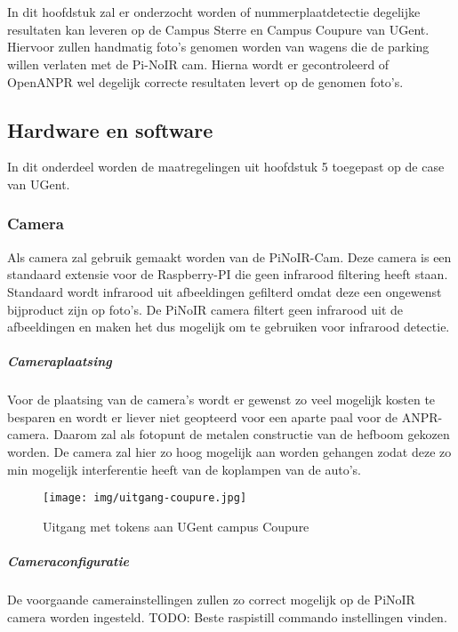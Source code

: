 
\chapter{}
\label{ch:praktischeUitvoering}
In dit hoofdstuk zal er onderzocht worden of nummerplaatdetectie degelijke resultaten kan leveren op de Campus Sterre en Campus Coupure van UGent. Hiervoor zullen handmatig foto's genomen worden van wagens die de parking willen verlaten met de Pi-NoIR cam. Hierna wordt er gecontroleerd of OpenANPR wel degelijk correcte resultaten levert op de genomen foto's.


\section{Hardware en software}
In dit onderdeel worden de maatregelingen uit hoofdstuk 5 toegepast op de case van UGent.

\subsection{Camera}
Als camera zal gebruik gemaakt worden van de PiNoIR-Cam. Deze camera is een standaard extensie voor de Raspberry-PI die geen infrarood filtering heeft staan. Standaard wordt infrarood uit afbeeldingen gefilterd omdat deze een ongewenst bijproduct zijn op foto's. De PiNoIR camera filtert geen infrarood uit de afbeeldingen en maken het dus mogelijk om te gebruiken voor infrarood detectie.

\paragraph{Cameraplaatsing}
Voor de plaatsing van de camera's wordt er gewenst zo veel mogelijk kosten te besparen en wordt er liever niet geopteerd voor een aparte paal voor de ANPR-camera. Daarom zal als fotopunt de metalen constructie van de hefboom gekozen worden. De camera zal hier zo hoog mogelijk aan worden gehangen zodat deze zo min mogelijk interferentie heeft van de koplampen van de auto's.

\begin{figure}[h!]
	\centering
	\texttt{[image: img/uitgang-coupure.jpg]}
	\caption{Uitgang met tokens aan UGent campus Coupure}
\end{figure}

\paragraph{Cameraconfiguratie}
De voorgaande camerainstellingen zullen zo correct mogelijk op de PiNoIR camera worden ingesteld.
TODO: Beste raspistill commando instellingen vinden.

